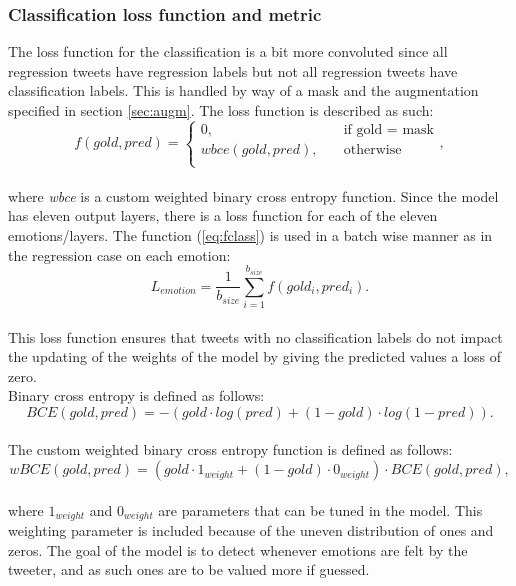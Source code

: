 \subsubsection{Classification loss function and metric}
The loss function for the classification is a bit more convoluted since all regression tweets have regression labels but not all regression tweets have classification labels. This is handled by way of a mask and the augmentation specified in section \ref{sec:augm}. The loss function is described as such:\\
\begin{equation} \label{eq:fclass}
f(gold,pred) =
     \begin{cases}
       0, &\quad\text{if gold = mask}\\
       wbce(gold,pred), &\quad\text{otherwise} \\
     \end{cases},
\end{equation}\\
where \textit{wbce} is a custom weighted binary cross entropy function. Since the model has eleven output layers, there is a loss function for each of the eleven emotions/layers. The function (\ref{eq:fclass}) is used in a batch wise manner as in the regression case on each emotion:\\
\begin{equation} \label{eq:lemotion}
L_{emotion}=\dfrac{1}{b_{size}} \sum_{i=1}^{b_{size}} f(gold_i, pred_i).
\end{equation}\\
 This loss function ensures that tweets with no classification labels do not impact the updating of the weights of the model by giving the predicted values a loss of zero.\\
Binary cross entropy is defined as follows:\\
\begin{equation}
BCE(gold,pred) = -(gold \cdot log(pred)+(1-gold) \cdot log(1-pred)).
\end{equation}\\
The custom weighted binary cross entropy function is defined as follows:\\
\begin{equation} \label{eq:wBCE}
wBCE(gold,pred) = (gold \cdot 1_{weight} + (1-gold) \cdot 0_{weight}) \cdot BCE(gold, pred),
\end{equation}\\
where $1_{weight}$ and $0_{weight}$ are parameters that can be tuned in the model. This weighting parameter is included because of the uneven distribution of ones and zeros. The goal of the model is to detect whenever emotions are felt by the tweeter, and as such ones are to be valued more if guessed.  \\ \\
